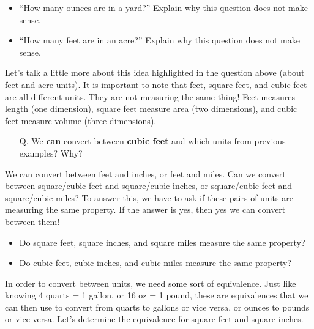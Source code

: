 \documentclass{ximera}
\begin{document}
\begin{exploration}
\begin{itemize}
\item``How many ounces are in a yard?'' Explain why this question does not make sense.
\item``How many feet are in an acre?'' Explain why this question does not make sense.
\end{itemize}
Let's talk a little more about this idea highlighted in the question above (about feet and acre units).  It is important to note that feet, square feet, and cubic feet are all different units.  They are not measuring the same thing!  Feet measures length (one dimension), square feet measure area (two dimensions), and cubic feet measure volume (three dimensions).
\begin{enumerate}
	\item[Q.] We \textbf{can} convert between \textbf{cubic feet} and {which units} from previous examples?  Why?
\end{enumerate}
We can convert between feet and inches, or feet and miles.  Can we convert between square/cubic feet and square/cubic inches, or square/cubic feet and square/cubic miles?  To answer this, we have to ask if these pairs of units are measuring the same property.  If the answer is yes, then yes we can convert between them!
\begin{itemize}
\item Do square feet, square inches, and square miles measure the same property?
\item Do cubic feet, cubic inches, and cubic miles measure the same property?
\end{itemize}
In order to convert between units, we need some sort of equivalence.  Just like knowing 4 quarts = 1 gallon, or 16 oz = 1 pound, these are equivalences that we can then use to convert from quarts to gallons or vice versa, or ounces to pounds or vice versa.  Let's determine the equivalence for square feet and square inches.
\begin{image}

\end{image}
\end{exploration}
\end{document}
